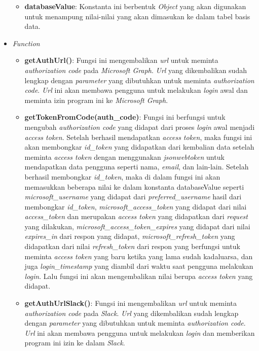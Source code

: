 \begin{itemize}
\begin{itemize}
        \item \textbf{databaseValue}: Konstanta ini berbentuk \textit{Object} yang akan digunakan untuk menampung nilai-nilai yang akan dimasukan ke dalam tabel basis data. 
    \end{itemize}
    \item \textit{Function}
    \begin{itemize}
        \item \textbf{getAuthUrl()}: Fungsi ini mengembalikan \textit{url} untuk meminta \textit{authorization code} pada \textit{Microsoft Graph}. \textit{Url} yang dikembalikan sudah lengkap dengan \textit{parameter} yang dibutuhkan untuk meminta \textit{authorization code}. \textit{Url} ini akan membawa pengguna untuk melakukan \textit{login} awal dan meminta izin program ini ke \textit{Microsoft Graph}. 
        \item \textbf{getTokenFromCode(auth\_code)}: Fungsi ini berfungsi untuk mengubah \textit{authorization code} yang didapat dari proses \textit{login} awal menjadi \textit{access token}. Setelah berhasil mendapatkan \textit{access token}, maka fungsi ini akan membongkar \textit{id\_token} yang didapatkan dari kembalian data setelah meminta \textit{access token} dengan menggunakan \textit{jsonwebtoken} untuk mendapatkan data pengguna seperti nama, \textit{email}, dan lain-lain. Setelah berhasil membongkar \textit{id\_token}, maka di dalam fungsi ini akan memasukkan beberapa nilai ke dalam konstanta databaseValue seperti \textit{microsoft\_username} yang didapat dari \textit{preferred\_username} hasil dari membongkar \textit{id\_token}, \textit{microsoft\_access\_token} yang didapat dari nilai \textit{access\_token} dan merupakan \textit{access token} yang didapatkan dari \textit{request} yang dilakukan, \textit{microsoft\_access\_token\_expires} yang didapat dari nilai \textit{expires\_in} dari respon yang didapat, \textit{microsoft\_refresh\_token} yang didapatkan dari nilai \textit{refresh\_token} dari respon yang berfungsi untuk meminta \textit{access token} yang baru ketika yang lama sudah kadaluarsa, dan juga \textit{login\_timestamp} yang diambil dari waktu saat pengguna melakukan \textit{login}. Lalu fungsi ini akan mengembalikan nilai berupa \textit{access token} yang didapat. 
        \item \textbf{getAuthUrlSlack()}: Fungsi ini mengembalikan \textit{url} untuk meminta \textit{authorization code} pada \textit{Slack}. \textit{Url} yang dikembalikan sudah lengkap dengan \textit{parameter} yang dibutuhkan untuk meminta \textit{authorization code}. \textit{Url} ini akan membawa pengguna untuk melakukan \textit{login} dan memberikan program ini izin ke dalam \textit{Slack}. 

\end{itemize}
\end{itemize}
